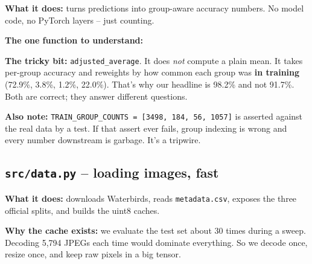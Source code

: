 \documentclass[11pt]{article}
\newcommand{\code}[1]{\texttt{\small #1}}
\begin{document}
\textbf{What it does:} turns predictions into group-aware accuracy numbers. No
model code, no PyTorch layers -- just counting.

\textbf{The one function to understand:}

\begin{center}
\end{center}

\textbf{The tricky bit:} \code{adjusted\_average}. It does \emph{not} compute a
plain mean. It takes per-group accuracy and reweights by how common each group
was \textbf{in training} (72.9\%, 3.8\%, 1.2\%, 22.0\%). That's why our headline
is 98.2\% and not 91.7\%. Both are correct; they answer different questions.

\textbf{Also note:} \code{TRAIN\_GROUP\_COUNTS = [3498, 184, 56, 1057]} is
asserted against the real data by a test. If that assert ever fails, group
indexing is wrong and every number downstream is garbage. It's a tripwire.

\subsection{\texttt{src/data.py} -- loading images, fast}

\textbf{What it does:} downloads Waterbirds, reads \code{metadata.csv}, exposes
the three official splits, and builds the uint8 caches.

\textbf{Why the cache exists:} we evaluate the test set about 30 times during a
sweep. Decoding 5{,}794 JPEGs each time would dominate everything. So we decode
once, resize once, and keep raw pixels in a big tensor.
\end{document}
